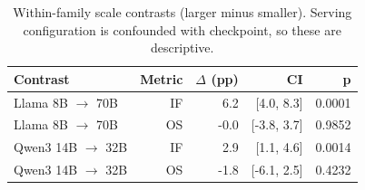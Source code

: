 \begin{table}[t]
\centering
\small
\caption{Within-family scale contrasts (larger minus smaller). Serving configuration is confounded with checkpoint, so these are descriptive.}
\label{tab:scale}
\begin{tabular}{lrrrr}
\toprule
Contrast & Metric & $\Delta$ (pp) & CI & p \\
\midrule
Llama 8B $\to$ 70B & IF & 6.2 & [4.0, 8.3] & 0.0001 \\
Llama 8B $\to$ 70B & OS & -0.0 & [-3.8, 3.7] & 0.9852 \\
Qwen3 14B $\to$ 32B & IF & 2.9 & [1.1, 4.6] & 0.0014 \\
Qwen3 14B $\to$ 32B & OS & -1.8 & [-6.1, 2.5] & 0.4232 \\
\bottomrule
\end{tabular}
\end{table}
